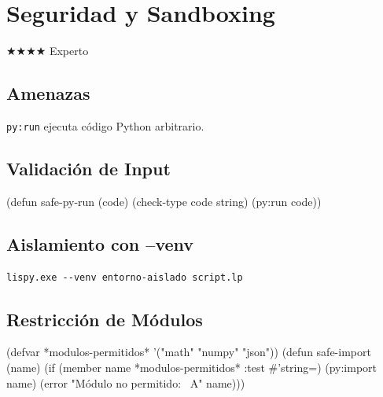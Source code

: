 \chapter{Seguridad y Sandboxing}
\label{chap:security}
{\huge$\bigstar$}{\huge$\bigstar$}{\huge$\bigstar$}{\huge$\bigstar$} Experto

\section{Amenazas}
\texttt{py:run} ejecuta código Python arbitrario.

\section{Validación de Input}
\begin{lispcode}
(defun safe-py-run (code)
  (check-type code string)
  (py:run code))
\end{lispcode}

\section{Aislamiento con --venv}
\begin{verbatim}
lispy.exe --venv entorno-aislado script.lp
\end{verbatim}

\section{Restricción de Módulos}
\begin{lispcode}
(defvar *modulos-permitidos* '("math" "numpy" "json"))
(defun safe-import (name)
  (if (member name *modulos-permitidos* :test #'string=)
      (py:import name)
      (error "Módulo no permitido: ~A" name)))
\end{lispcode}

